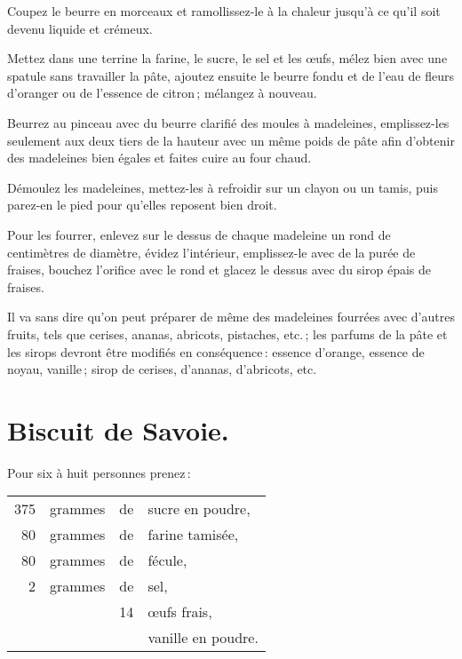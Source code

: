 Coupez le beurre en morceaux et ramollissez-le à la chaleur jusqu'à ce qu'il soit
devenu liquide et crémeux.

Mettez dans une terrine la farine, le sucre, le sel et les œufs, mélez bien
avec une spatule sans travailler la pâte, ajoutez ensuite le beurre fondu et de
l’eau de fleurs d'oranger ou de l'essence de citron ; mélangez à nouveau.

Beurrez au pinceau avec du beurre clarifié des moules à madeleines,
emplissez-les seulement aux deux tiers de la hauteur avec un même poids de pâte
afin d'obtenir des madeleines bien égales et faites cuire au four chaud.

Démoulez les madeleines, mettez-les à refroidir sur un clayon ou un tamis,
puis parez-en le pied pour qu'elles reposent bien droit.

Pour les fourrer, enlevez sur le dessus de chaque madeleine un rond de
{\mmm} centimètres de diamètre, évidez l'intérieur, emplissez-le avec de
la purée de fraises, bouchez l'orifice avec le rond et glacez le dessus avec du
sirop épais de fraises.

\sk

Il va sans dire qu'on peut préparer de même des madeleines fourrées avec
d'autres fruits, tels que cerises, ananas, abricots, pistaches, etc. ; les
parfums de la pâte et les sirops devront être modifiés en conséquence : essence
d'orange, essence de noyau, vanille ; sirop de cerises, d'ananas, d’abricots,
etc.

\section*{\centering Biscuit de Savoie.}
{}

Pour six à huit personnes prenez :

\footnotesize
\begin{longtable}{rrrp{16em}}
    375 & grammes & de & sucre en poudre,                                                                 \\
     80 & grammes & de & farine tamisée,                                                                  \\
     80 & grammes & de & fécule,                                                                          \\
      2 & grammes & de & sel,                                                                             \\
        &         & 14 & œufs frais,                                                                      \\
        &         &    & vanille en poudre.                                                               \\
\end{longtable}
\normalsize

